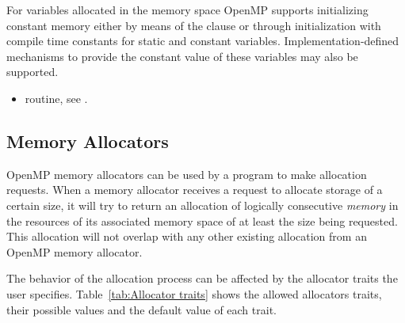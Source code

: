 \linenumbers

\begin{note}
For variables allocated in the  memory space OpenMP supports initializing constant memory either by means of the  clause or through initialization with compile time constants for static and constant variables. Implementation-defined mechanisms to provide the constant value of these variables may also be supported.
 \end{note}


\crossreferences
\begin{itemize}
\item {} routine, see .
\end{itemize}

\subsection{Memory Allocators}
\label{subsec:Memory Allocators}

OpenMP memory allocators can be used by a program to make allocation requests. When a memory allocator receives a request to allocate storage of a certain size, it will try to return an allocation of logically consecutive \emph{memory} in the resources of its associated memory space of at least the size being requested. This allocation will not overlap with any other existing allocation from an OpenMP memory allocator. 

The behavior of the allocation process can be affected by the allocator traits the user specifies. Table~\ref{tab:Allocator traits} shows the allowed allocators traits, their possible values and the default value of each trait. %

